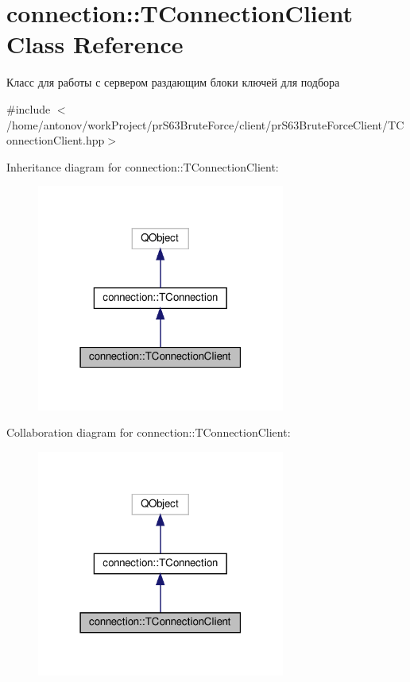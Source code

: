 \hypertarget{classconnection_1_1_t_connection_client}{}\section{connection\+:\+:T\+Connection\+Client Class Reference}
\label{classconnection_1_1_t_connection_client}


Класс для работы с сервером раздающим блоки ключей для подбора  




{\ttfamily \#include $<$/home/antonov/work\+Project/pr\+S63\+Brute\+Force/client/pr\+S63\+Brute\+Force\+Client/\+T\+Connection\+Client.\+hpp$>$}



Inheritance diagram for connection\+:\+:T\+Connection\+Client\+:\nopagebreak
\begin{figure}[H]
\begin{center}
\leavevmode
\includegraphics[width=231pt]{classconnection_1_1_t_connection_client__inherit__graph}
\end{center}
\end{figure}


Collaboration diagram for connection\+:\+:T\+Connection\+Client\+:\nopagebreak
\begin{figure}[H]
\begin{center}
\leavevmode
\includegraphics[width=231pt]{classconnection_1_1_t_connection_client__coll__graph}
\end{center}
\end{figure}
